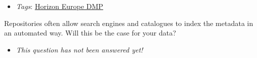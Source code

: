 \documentclass[a4paper,12pt]{report}
\begin{document}
\begin{itemize}
  \item \textit{Tags}: \ul{Horizon Europe DMP}
  \end{itemize}


\noindent
\begin{markdown}
Repositories often allow search engines and catalogues to index the metadata in an automated way. Will this be the case for your data?
\end{markdown}



\begin{itemize}
  \item[\XSolidBrush] \textit{This question has not been answered yet!}
\end{itemize}
  
\end{document}
